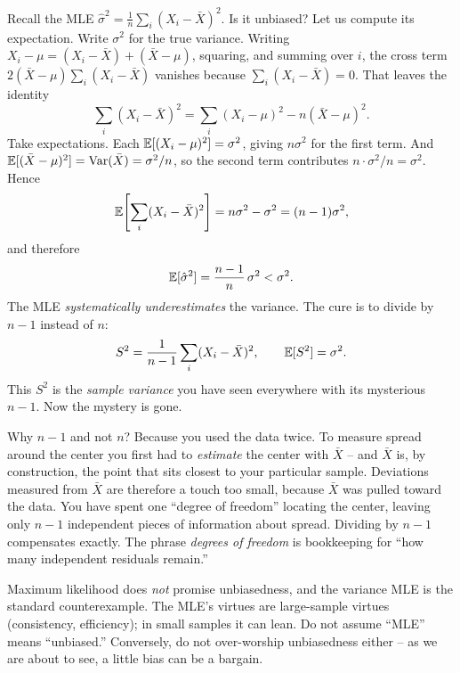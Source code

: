 \begin{example}
\label{ch30:ex-biased-var}
Recall the MLE $\hat\sigma^2 = \frac1n\sum_i(X_i-\bar X)^2$. Is it unbiased? Let
us compute its expectation. Write $\sigma^2$ for the true variance. Writing
$X_i - \mu = (X_i - \bar X) + (\bar X - \mu)$, squaring, and summing over $i$, the cross
term $2(\bar X - \mu)\sum_i (X_i - \bar X)$ vanishes because $\sum_i (X_i - \bar X) = 0$.
That leaves the identity
\[
  \sum_i (X_i-\bar X)^2 = \sum_i (X_i-\mu)^2 - n(\bar X-\mu)^2.
\]
Take expectations. Each $\operatorname{\mathbb{E}}[(X_i-\mu)^2]=\sigma^2$, giving $n\sigma^2$ for the
first term. And $\operatorname{\mathbb{E}}[(\bar X-\mu)^2]=\operatorname{Var}(\bar X)=\sigma^2/n$, so the second term
contributes $n\cdot\sigma^2/n=\sigma^2$. Hence
\[
  \operatorname{\mathbb{E}}\!\left[\sum_i(X_i-\bar X)^2\right] = n\sigma^2 - \sigma^2 = (n-1)\sigma^2,
\]
and therefore
\[
  \operatorname{\mathbb{E}}[\hat\sigma^2] = \frac{n-1}{n}\,\sigma^2 < \sigma^2.
\]
The MLE \emph{systematically underestimates} the variance. The cure is to divide
by $n-1$ instead of $n$:
\[
  S^2 = \frac{1}{n-1}\sum_i (X_i-\bar X)^2,
  \qquad \operatorname{\mathbb{E}}[S^2] = \sigma^2.
\]
This $S^2$ is the \emph{sample variance} you have seen everywhere with its
mysterious $n-1$. Now the mystery is gone.
\end{example}

\begin{whybox}
Why $n-1$ and not $n$? Because you used the data twice. To measure spread around
the center you first had to \emph{estimate} the center with $\bar X$ -- and
$\bar X$ is, by construction, the point that sits closest to your particular
sample. Deviations measured from $\bar X$ are therefore a touch too small,
because $\bar X$ was pulled toward the data. You have spent one ``degree of
freedom'' locating the center, leaving only $n-1$ independent pieces of
information about spread. Dividing by $n-1$ compensates exactly. The phrase
\emph{degrees of freedom} is bookkeeping for ``how many independent
residuals remain.''
\end{whybox}

\begin{trapbox}
Maximum likelihood does \emph{not} promise unbiasedness, and the variance MLE is
the standard counterexample. The MLE's virtues are large-sample virtues
(consistency, efficiency); in small samples it can lean. Do not assume ``MLE''
means ``unbiased.'' Conversely, do not over-worship unbiasedness either -- as we
are about to see, a little bias can be a bargain.
\end{trapbox}

